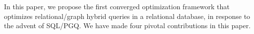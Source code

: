 In this paper, we propose the first converged optimization framework that optimizes relational/graph hybrid queries in a relational database, in response to the advent of SQL/PGQ. %
We have made four pivotal contributions in this paper.

